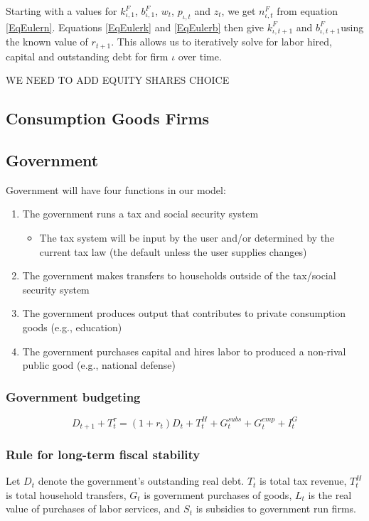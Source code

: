 \documentclass[letterpaper,12pt]{article}
\theoremstyle{definition}
\begin{document}
\begin{spacing}{1.5}
      Starting with a values for $k^F_{\iota,1}$, $b^F_{\iota,1}$, $w_t$, $p_{\iota,t}$ and $z_t$, we get $n^F_{\iota,t}$ from equation \eqref{EqEulern}. Equations \eqref{EqEulerk} and \eqref{EqEulerb} then give $k^F_{\iota,t+1}$ and $b^F_{\iota,t+1}$using the known value of $r_{t+1}$.  This allows us to iteratively solve for labor hired, capital and outstanding debt for firm $\iota$ over time.

      WE NEED TO ADD EQUITY SHARES CHOICE

  \subsection{Consumption Goods Firms}

  \subsection{Government}
    Government will have four functions in our model:
    \begin{enumerate}
    \item The government runs a tax and social security system
      \begin{itemize}
      \item The tax system will be input by the user and/or determined by the current tax law (the default unless the user supplies changes)
      \end{itemize}
    \item The government makes transfers to households outside of the tax/social security system
    \item The government produces output that contributes to private consumption goods (e.g., education)
    \item The government purchases capital and hires labor to produced a non-rival public good (e.g., national defense)
    \end{enumerate}

    \subsubsection{Government budgeting}
      \begin{equation}
      \label{eqn:gbc}
      D_{t+1} + T^{\tau}_{t} = (1+r_{t})D_{t} + T^{H}_{t} + G^{subs}_{t} + G^{emp}_{t} + I^{G}_{t}
      \end{equation}

    \subsubsection{Rule for long-term fiscal stability}
      Let $D_t$ denote the government's outstanding real debt.  $T_t$ is total tax revenue, $T^H_t$ is total household transfers, $G_t$ is government purchases of goods, $L_t$ is the real value of purchases of labor services, and $S_t$ is subsidies to government run firms.


\end{spacing}
\end{document}
